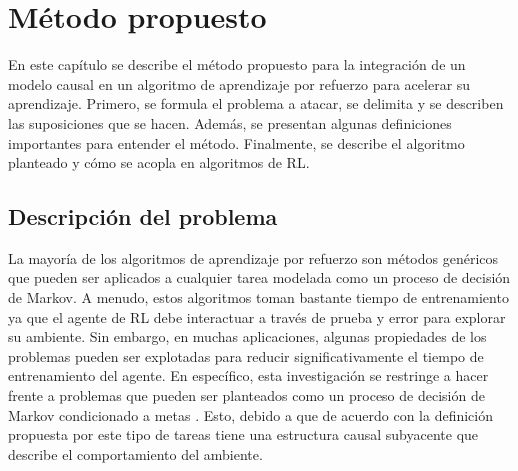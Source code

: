 \chapter{Método propuesto}\label{chapter4}

\graphicspath{{Chapter4/Figs/}}

En este capítulo se describe el método propuesto para la integración
de un modelo causal en un algoritmo de aprendizaje por refuerzo para
acelerar su aprendizaje. Primero, se formula el problema a atacar, se delimita
y se describen las suposiciones que se hacen. Además, se presentan algunas definiciones 
importantes para entender el método.
Finalmente, se describe el algoritmo planteado y cómo se acopla en algoritmos de RL. 

    
\section{Descripción del problema}

La mayoría de los algoritmos de aprendizaje por refuerzo son métodos genéricos que pueden ser aplicados a cualquier tarea modelada como un proceso de decisión de Markov.
A menudo, estos algoritmos toman bastante tiempo de entrenamiento ya que el agente de RL debe
interactuar a través de prueba y error para explorar su ambiente. 
Sin embargo, en muchas aplicaciones, algunas
propiedades de los problemas pueden ser explotadas para reducir significativamente el tiempo
de entrenamiento del agente. En específico, esta investigación se restringe a hacer frente
a problemas que pueden ser planteados como un proceso de decisión de Markov condicionado a metas
\cite{nair2019causal}. Esto, debido a que de acuerdo  con la definición propuesta por \cite{nair2019causal} este 
tipo de tareas tiene una estructura causal subyacente que describe el comportamiento del ambiente.

